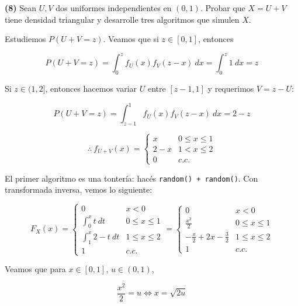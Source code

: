 \documentclass[a4paper, 12pt]{article}
\begin{document}
\begin{myframe}
  \textbf{(8)} Sean $U, V$ dos uniformes independientes en $(0, 1)$. Probar que
  $X = U + V$ tiene densidad triangular y desarrolle tres algoritmos que simulen
  $X$.
\end{myframe}

Estudiemos $P(U + V = z)$. Veamos que si $z \in [0, 1]$, entonces

\begin{equation*}
  P(U + V = z) = \int_0^z f_{U}(x)f_{V}(z-x) ~ dx = \int_0^z 1 ~ dx 
  =z
\end{equation*}

Si $z \in (1, 2]$, entonces hacemos variar $U$ entre $[z-1, 1]$ y requerimos
$V = z - U$:

\begin{equation*}
  P(U + V = z) 
  = \int_{z-1}^{1} f_{U}(x) f_{V}(z - x) ~  dx = 2 -z
\end{equation*}

\begin{equation*}
  \therefore ~ f_{U + V}(x) = \begin{cases}
    x & 0 \leq x \leq 1 \\ 
    2 - x & 1 < x \leq 2 \\ 
    0 & c.c.
  \end{cases}
\end{equation*}

El primer algoritmo es una tontería: hacés \texttt{random() + random()}. Con
transformada inversa, vemos lo siguiente:

\begin{equation*}
  F_X(x) = \begin{cases}
    0 & x < 0\\
    \int_0^x t ~ dt & 0 \leq x \leq 1 \\ 
    \int_1^x 2 - t ~ dt & 1 \leq x \leq 2  \\ 
    1 & c.c.
  \end{cases} = \begin{cases}
    0 & x < 0 \\ 
    \frac{x^2}{2} & 0 \leq x \leq 1 \\ 
    -\frac{x}{2} + 2x - \frac{3}{2} & 1 \leq x \leq 2 \\ 
    1 & c.c.
  \end{cases}
\end{equation*}

Veamos que para $x \in [0, 1]$,  $u \in (0, 1)$,

\begin{equation*}
  \frac{x^2}{2} = u \iff x = \sqrt{2u} 
\end{equation*}
\end{document}
